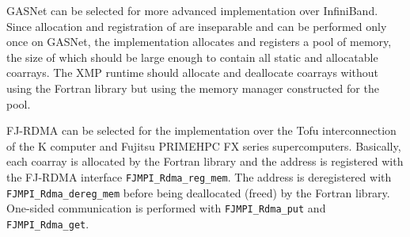 GASNet can be selected for more advanced implementation over InfiniBand. 
Since allocation and registration of are inseparable and can be performed only once 
on GASNet, the implementation allocates and registers a pool of memory,
the size of which should be large enough to contain all static and allocatable coarrays.
The XMP runtime should allocate and deallocate coarrays without using the Fortran 
library but using the memory manager constructed for the pool.

FJ-RDMA can be selected for the implementation over the Tofu interconnection of 
the K computer and Fujitsu PRIMEHPC FX series supercomputers. 
Basically, each coarray is allocated by the Fortran library and 
the address is registered with the FJ-RDMA interface {\tt FJMPI\_Rdma\_reg\_mem}. 
The address is deregistered with {\tt FJMPI\_Rdma\_dereg\_mem} before being deallocated 
(freed) by the Fortran library. 
One-sided communication is performed with {\tt FJMPI\_Rdma\_put} and 
{\tt FJMPI\_Rdma\_get}.
